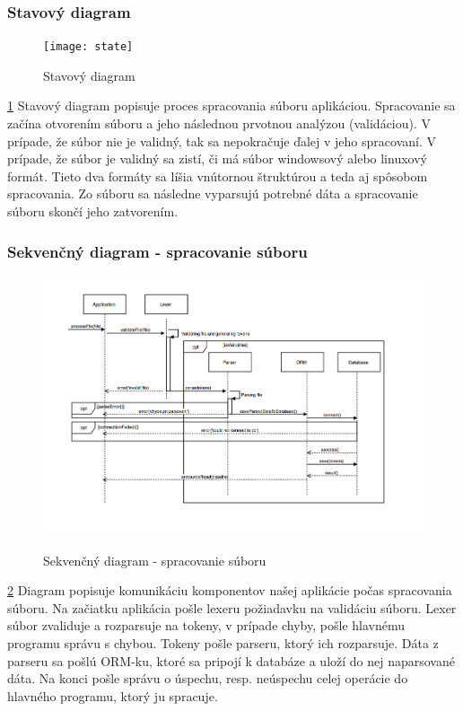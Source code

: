 \documentclass[12pt,a4paper]{article}
\begin{document}
\subsubsection{Stavový diagram}
\begin{figure}[H]
	\caption{Stavový diagram}
	\texttt{[image: state]}
	\label{fig:state}
\end{figure}
\ref{fig:state}
Stavový diagram popisuje proces spracovania súboru aplikáciou. Spracovanie sa začína otvorením súboru a jeho následnou prvotnou analýzou (validáciou). V prípade, že súbor nie je validný, tak sa nepokračuje ďalej v jeho spracovaní. V prípade, že súbor je validný sa zistí, či má súbor windowsový alebo linuxový formát. Tieto dva formáty sa líšia vnútornou štruktúrou a teda aj spôsobom spracovania. Zo súboru sa následne vyparsujú potrebné dáta a spracovanie súboru skončí jeho zatvorením. 

\subsubsection{Sekvenčný diagram - spracovanie súboru}
\begin{figure}[H]
	\caption{Sekvenčný diagram - spracovanie súboru}
	\includegraphics[width=\textwidth]{sequence_file}
	\label{fig:seq}
\end{figure}
\ref{fig:seq}
Diagram popisuje komunikáciu komponentov našej aplikácie počas spracovania súboru. Na začiatku aplikácia pošle lexeru požiadavku na validáciu súboru. Lexer súbor zvaliduje a rozparsuje na tokeny, v prípade chyby, pošle hlavnému programu správu s chybou. Tokeny pošle parseru, ktorý ich rozparsuje. Dáta z parseru sa pošlú ORM-ku, ktoré sa pripojí k databáze a uloží do nej naparsované dáta. Na konci pošle správu o úspechu, resp. neúspechu celej operácie do hlavného programu, ktorý ju spracuje.
\end{document}
